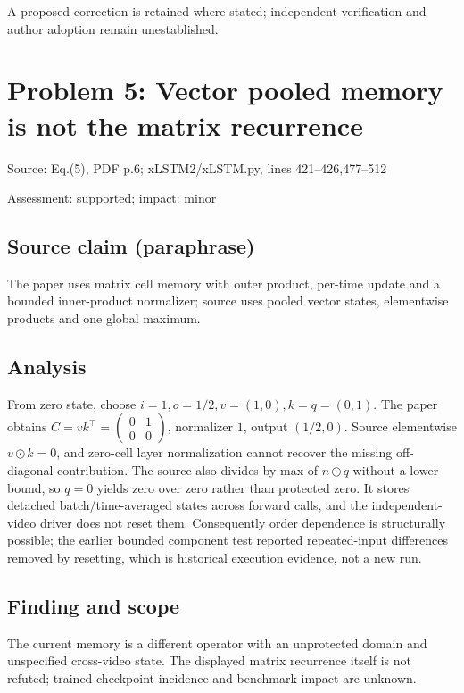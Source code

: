 \documentclass[11pt]{article}
\begin{document}
A proposed correction is retained where stated; independent verification and author adoption remain unestablished.

\section*{Problem 5: Vector pooled memory is not the matrix recurrence}

Source: Eq.(5), PDF p.6; xLSTM2/xLSTM.py, lines 421–426,477–512

Assessment: supported; impact: minor

\subsection*{Source claim (paraphrase)}

The paper uses matrix cell memory with outer product, per-time update and a bounded inner-product normalizer; source uses pooled vector states, elementwise products and one global maximum.

\subsection*{Analysis}

From zero state, choose \(i=1,o=1/2,v=(1,0),k=q=(0,1)\). The paper obtains \(C=vk^\top=\begin{pmatrix}0&1\\0&0\end{pmatrix}\), normalizer \(1\), output \((1/2,0)\). Source elementwise \(v\odot k=0\), and zero-cell layer normalization cannot recover the missing off-diagonal contribution. The source also divides by max of \(n\odot q\) without a lower bound, so \(q=0\) yields zero over zero rather than protected zero. It stores detached batch/time-averaged states across forward calls, and the independent-video driver does not reset them. Consequently order dependence is structurally possible; the earlier bounded component test reported repeated-input differences removed by resetting, which is historical execution evidence, not a new run.

\subsection*{Finding and scope}

The current memory is a different operator with an unprotected domain and unspecified cross-video state. The displayed matrix recurrence itself is not refuted; trained-checkpoint incidence and benchmark impact are unknown.
\end{document}

